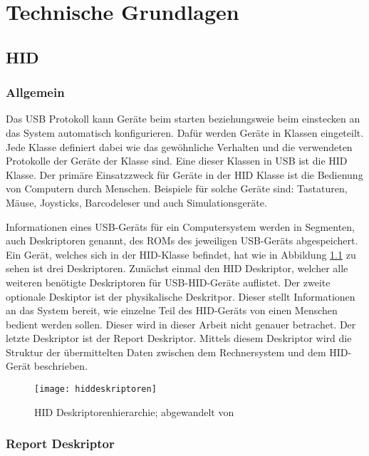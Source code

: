 
\chapter{Technische Grundlagen}

\section{\acf{HID}}

\subsection{Allgemein}
Das USB Protokoll kann Geräte beim starten beziehungsweie beim einstecken an das System automatisch konfigurieren. Dafür werden Geräte in Klassen eingeteilt. Jede Klasse definiert dabei wie das gewöhnliche Verhalten und die verwendeten Protokolle der Geräte der Klasse sind. Eine dieser Klassen in USB ist die \ac{HID} Klasse. Der primäre Einsatzzweck für Geräte in der \acs{HID} Klasse ist die Bedienung von Computern durch Menschen. Beispiele für solche Geräte sind: Tastaturen, Mäuse, Joysticks, Barcodeleser und auch Simulationsgeräte. \cite[S.~1f.]{usbHIDS}

Informationen eines USB-Geräts für ein Computersystem werden in Segmenten, auch Deskriptoren genannt, des ROMs des jeweiligen USB-Geräts abgespeichert. Ein Gerät, welches sich in der \acs{HID}-Klasse befindet, hat wie in Abbildung \ref{fig:hiddeskriptoren} zu sehen ist drei Deskriptoren. Zunächst einmal den \acs{HID} Deskriptor, welcher alle weiteren benötigte Deskriptoren für USB-\acs{HID}-Geräte auflistet. Der zweite optionale Deskiptor ist der physikalische Deskritpor. Dieser stellt Informationen an das System bereit, wie einzelne Teil des \acs{HID}-Geräts von einen Menschen bedient werden sollen. Dieser wird in dieser Arbeit nicht genauer betrachet. Der letzte Deskriptor ist der Report Deskriptor. Mittels diesem Deskriptor wird die Struktur der übermittelten Daten zwischen dem Rechnersystem und dem \acs{HID}-Gerät beschrieben. \cite[S.~4f.]{usbHIDS}

\begin{figure}[h]
    \centering
    \texttt{[image: hiddeskriptoren]}
    \caption{\acs{HID} Deskriptorenhierarchie; abgewandelt von \cite[S.~4]{usbHIDS}}
    \label{fig:hiddeskriptoren}
\end{figure}

\subsection{Report Deskriptor}


